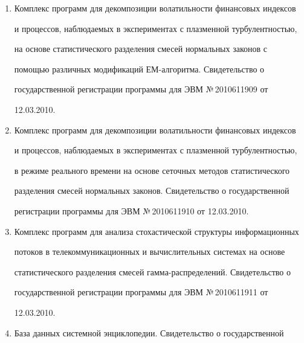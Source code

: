 \begin{enumerate}[1.]
ML03. Свидетельство о государственной регистрации программы для ЭВМ 


№\,2010611908 от 12.03.2010.


\item {}


Комплекс программ для декомпозиции волатильности финансовых индексов 


и процессов, наблюдаемых в экспериментах с плазменной турбулентностью, 


на основе статистического разделения смесей нормальных законов с 


помощью различных модификаций ЕМ-ал\-го\-рит\-ма. Свидетельство о 


государственной регистрации программы для ЭВМ №\,2010611909 от 


12.03.2010.


\item {}


Комплекс программ для декомпозиции волатильности финансовых индексов 


и процессов, наблюдаемых в экспериментах с плазменной турбулентностью, 


в режиме реального времени на основе сеточных методов статистического 


разделения смесей нормальных законов. Свидетельство о государственной 


регистрации программы для ЭВМ №\,2010611910 от 12.03.2010.


\item {}


Комплекс программ для анализа стохастической структуры информационных 


потоков в телекоммуникационных и вычислительных сис\-темах на основе 


статистического разделения смесей гамма-распределений. Свидетельство о 


государственной регистрации программы для ЭВМ №\,2010611911 от 


12.03.2010.


\item {}


База данных сис\-темной энциклопедии. Свидетельство о государственной 



\end{enumerate}
